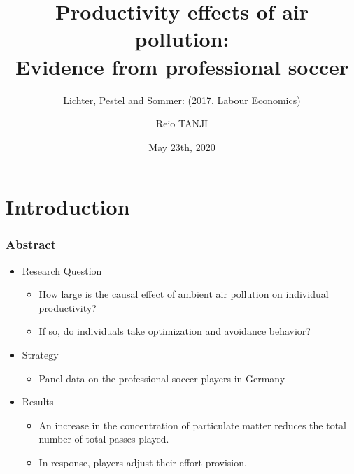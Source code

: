 \documentclass[dvipdfmx,11pt]{beamer}
\title{Productivity effects of air pollution: \\ Evidence from professional soccer}
\subtitle{Lichter, Pestel and Sommer: (2017, Labour Economics)}
\author{Reio TANJI}
\date{May 23th, 2020}
\institute{Osaka University, Graduate School of Economics}
\begin{document}
\begin{frame}\frametitle{}
\titlepage
\end{frame}

\section{Introduction}

\begin{frame}\frametitle{Abstract}
  \begin{itemize}
    \item Research Question
    \begin{itemize}
      \item How large is the causal effect of ambient air pollution on individual productivity?
      \item If so, do individuals take optimization and avoidance behavior?
    \end{itemize}
    \item Strategy
    \begin{itemize}
      \item Panel data on the professional soccer players in Germany
    \end{itemize}
    \item Results
    \begin{itemize}
      \item An increase in the concentration of particulate matter reduces the total number of total passes played.
      \item In response, players adjust their effort provision.
    \end{itemize}
  \end{itemize}
\end{frame}
\end{document}

